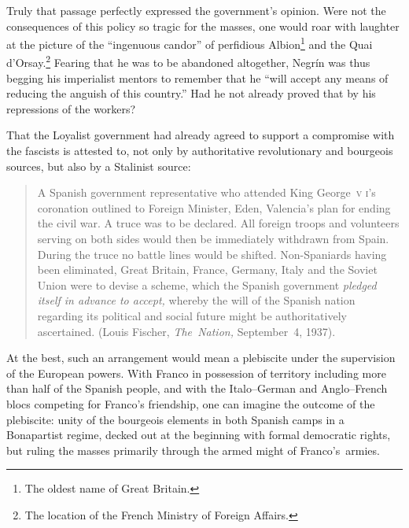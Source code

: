 Truly that passage perfectly expressed the government’s opinion. Were not the consequences of this policy so tragic for the masses, one would roar with laughter at the picture of the ``ingenuous candor'' of perfidious Albion\footnote{The oldest name of Great Britain.} and the Quai d’Orsay.\footnote{The location of the French Ministry of Foreign Affairs.} Fearing that he was to be abandoned altogether, Negr\'in was thus begging his imperialist mentors to remember that he ``will accept any means of reducing the anguish of this country.'' Had he not already proved that by his repressions of the workers?%

That the Loyalist government had already agreed to support a compromise with the fascists is attested to, not only by authoritative revolutionary and bourgeois sources, but also by a Stalinist source:

\indexLFischer
\begin{quotation}
  A Spanish government representative who attended King George~\textsc{v\kern -1.5pt i}’s coronation outlined to Foreign Minister, Eden, Valencia’s plan for ending the civil war. A truce was to be declared. All foreign troops and volunteers serving on both sides would then be immediately withdrawn from Spain. During the truce no battle lines would be shifted. Non-Spaniards having been eliminated, Great Britain, France, Germany, Italy and the Soviet Union were to devise a scheme, which the Spanish government \emph{pledged itself in advance to accept,} whereby the will of the Spanish nation regarding its political and social future might be authoritatively ascertained. (Louis Fischer, \emph{The~Nation,} September~4, 1937).
\end{quotation}

At the best, such an arrangement would mean a plebiscite under the supervision of the European powers. With Franco in possession of territory including more than half of the Spanish people, and with the Italo--German and Anglo--French blocs competing for Franco’s friendship, one can imagine the outcome of the plebiscite: unity of the bourgeois elements in both Spanish camps in a Bonapartist regime, decked out at the beginning with formal democratic rights, but ruling the masses primarily through the armed might of Franco’s~armies.

